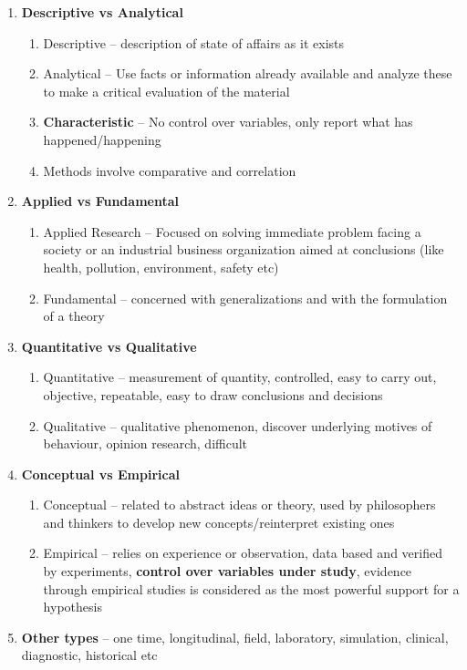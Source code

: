 \documentclass{article}
\begin{document}
\begin{enumerate}

    \item \textbf{Descriptive vs Analytical}
    \begin{enumerate}
        \item Descriptive -- description of state of affairs as it exists
        \item Analytical -- Use facts or information already
available and analyze these to make a critical evaluation of the material
        \item \textbf{Characteristic} -- No control over variables, only report what has happened/happening
        \item Methods involve comparative and correlation
    \end{enumerate}
    
    \item \textbf{Applied vs Fundamental}
    \begin{enumerate}
        \item Applied Research -- Focused on solving immediate problem facing a society or an industrial business organization aimed at conclusions (like health, pollution, environment, safety etc)
        \item Fundamental -- concerned with generalizations and with the formulation of a theory
    \end{enumerate}
    
    \item \textbf{Quantitative vs Qualitative}
    \begin{enumerate}
        \item Quantitative -- measurement of quantity, controlled, easy to carry out, objective, repeatable, easy to draw conclusions and decisions
        \item Qualitative -- qualitative phenomenon, discover underlying motives of behaviour, opinion research, difficult
    \end{enumerate}
    
    \item \textbf{Conceptual vs Empirical}
    \begin{enumerate}
        \item Conceptual -- related to abstract ideas or theory, used by philosophers and thinkers to develop new concepts/reinterpret existing ones
        \item Empirical -- relies on experience or observation, data based and verified by experiments, \textbf{control over variables under study}, evidence through empirical studies is considered as the most powerful support for a hypothesis 
    \end{enumerate}
    
    \item \textbf{Other types} -- one time, longitudinal, field, laboratory, simulation, clinical, diagnostic, historical etc
    
\end{enumerate}
\end{document}
